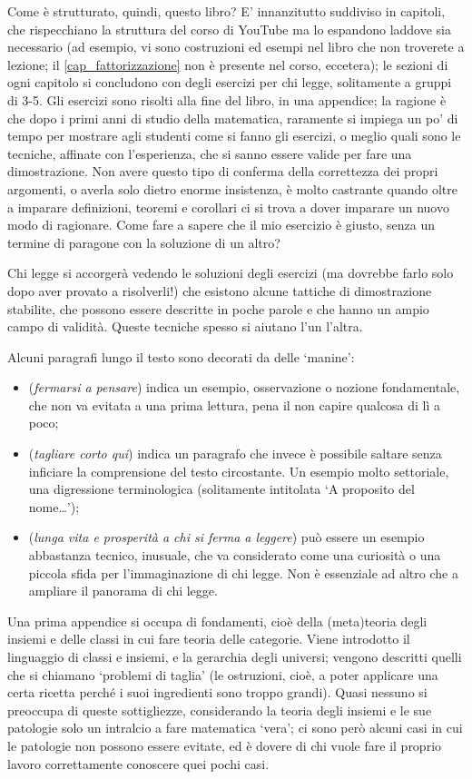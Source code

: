 \medskip
Come è strutturato, quindi, questo libro? E' innanzitutto suddiviso in capitoli, che rispecchiano la struttura del corso di YouTube ma lo espandono laddove sia necessario (ad esempio, vi sono costruzioni ed esempi nel libro che non troverete a lezione; il \autoref{cap_fattorizzazione} non è presente nel corso, eccetera); le sezioni di ogni capitolo si concludono con degli esercizi per chi legge, solitamente a gruppi di 3-5. Gli esercizi sono risolti alla fine del libro, in una appendice; la ragione è che dopo i primi anni di studio della matematica, raramente si impiega un po' di tempo per mostrare agli studenti come si fanno gli esercizi, o meglio quali sono le tecniche, affinate con l'esperienza, che si sanno essere valide per fare una dimostrazione. Non avere questo tipo di conferma della correttezza dei propri argomenti, o averla solo dietro enorme insistenza, è molto castrante quando oltre a imparare definizioni, teoremi e corollari ci si trova a dover imparare un nuovo modo di ragionare. Come fare a sapere che il mio esercizio è giusto, senza un termine di paragone con la soluzione di un altro?

Chi legge si accorgerà vedendo le soluzioni degli esercizi (ma dovrebbe farlo solo dopo aver provato a risolverli!) che esistono alcune tattiche di dimostrazione stabilite, che possono essere descritte in poche parole e che hanno un ampio campo di validità. Queste tecniche spesso si aiutano l'un l'altra.

Alcuni paragrafi lungo il testo sono decorati da delle `manine':
\begin{itemize}
	\item {} (\emph{fermarsi a pensare}) indica un esempio, osservazione o nozione fondamentale, che non va evitata a una prima lettura, pena il non capire qualcosa di lì a poco;
	\item {} (\emph{tagliare corto qui}) indica un paragrafo che invece è possibile saltare senza inficiare la comprensione del testo circostante. Un esempio molto settoriale, una digressione terminologica (solitamente intitolata `A proposito del nome\dots');
	\item {} (\emph{lunga vita e prosperità a chi si ferma a leggere}) può essere un esempio abbastanza tecnico, inusuale, che va considerato come una curiosità o una piccola sfida per l'immaginazione di chi legge. Non è essenziale ad altro che a ampliare il panorama di chi legge.
\end{itemize}
Una prima appendice si occupa di fondamenti, cioè della (meta)teoria degli insiemi e delle classi in cui fare teoria delle categorie. Viene introdotto il linguaggio di classi e insiemi, e la gerarchia degli universi; vengono descritti quelli che si chiamano `problemi di taglia' (le ostruzioni, cioè, a poter applicare una certa ricetta perché i suoi ingredienti sono troppo grandi). Quasi nessuno si preoccupa di queste sottigliezze, considerando la teoria degli insiemi e le sue patologie solo un intralcio a fare matematica `vera'; ci sono però alcuni casi in cui le patologie non possono essere evitate, ed è dovere di chi vuole fare il proprio lavoro correttamente conoscere quei pochi casi.

